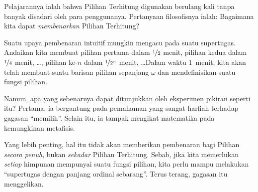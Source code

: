 \documentclass[../../../include/open-logic-section]{subfiles}
\begin{document}
Pelajarannya ialah bahwa Pilihan Terhitung digunakan berulang kali tanpa
banyak disadari oleh para penggunanya. Pertanyaan filosofisnya ialah:
Bagaimana kita dapat \emph{membenarkan} Pilihan Terhitung?

Suatu upaya pembenaran intuitif mungkin mengacu pada suatu supertugas.
Andaikan kita membuat pilihan pertama dalam $\nicefrac{1}{2}$ menit,
pilihan kedua dalam $\nicefrac{1}{4}$ menit, \dots, pilihan ke-$n$ dalam
$\nicefrac{1}{2^n}$ menit, \dots\@ Dalam waktu $1$~menit, kita akan telah
membuat suatu barisan pilihan sepanjang $\omega$ dan mendefinisikan suatu
fungsi pilihan.

Namun, apa yang sebenarnya dapat ditunjukkan oleh eksperimen pikiran seperti
itu? Pertama, ia bergantung pada pemahaman yang sangat harfiah terhadap
gagasan ``memilih''. Selain itu, ia tampak mengikat matematika pada
kemungkinan metafisis.

Yang lebih penting, hal itu tidak akan memberikan pembenaran bagi Pilihan
\emph{secara penuh}, bukan \emph{sekadar} Pilihan Terhitung. Sebab, jika kita
memerlukan \emph{setiap} himpunan mempunyai suatu fungsi pilihan, kita perlu
mampu melakukan ``supertugas dengan panjang ordinal sebarang''. Terus
terang, gagasan itu menggelikan.
\end{document}
